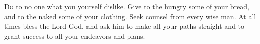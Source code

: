 
\lettrine{D}{o} to no one what you yourself dislike. Give to the hungry some of your bread, and to the naked some of your clothing. Seek counsel from every wise man. At all times bless the Lord God, and ask him to make all your paths straight and to grant success to all your endeavors and plans.